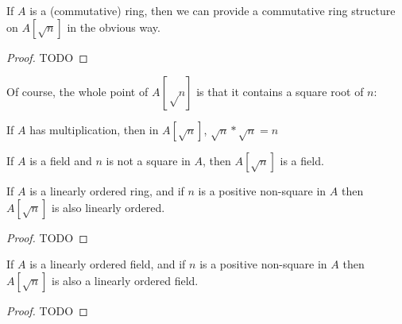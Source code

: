 
\begin{lemma}
  \label{thm:adjoinRing}
  \leanok
  If $A$ is a (commutative) ring, then we can provide a commutative ring structure
  on $A[\sqrt{n}]$ in the obvious way.
\end{lemma}

\begin{proof}
  TODO
\end{proof}


Of course, the whole point of $A[√n]$ is that it contains a square root of $n$:
\begin{theorem}
  \label{thm:adjoinHasSqrtN}
  If $A$ has multiplication, then in $A[\sqrt{n}]$, $\sqrt{n} * \sqrt{n} = n$
\end{theorem}


\begin{lemma}
  \label{thm:adjoinField}
  \leanok
  If $A$ is a field and $n$ is not a square in $A$, then $A[\sqrt{n}]$ is a
  field.
\end{lemma}


\begin{lemma}
  \label{thm:adjoinOrderedRing}

  If $A$ is a linearly ordered ring, and if $n$ is a positive non-square in $A$
  then $A[\sqrt{n}]$ is also linearly ordered.
\end{lemma}

\begin{proof}
  TODO
\end{proof}


\begin{theorem}
  \label{thm:adjoinOrderedField}

  If $A$ is a linearly ordered field, and if $n$ is a positive non-square in $A$
  then $A[\sqrt{n}]$ is also a linearly ordered field.
\end{theorem}
\begin{proof}
  TODO
\end{proof}

